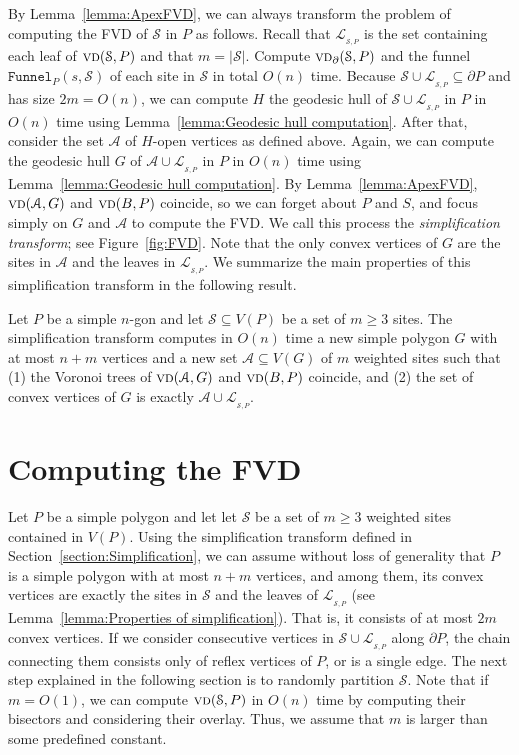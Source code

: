\documentclass[a4paper,UKenglish]{socg-lipics-v2018}
\newcommand{\s}{\mathcal S}
\newcommand{\funnel}[2][P]{\ensuremath{\mathtt{Funnel}_{\scriptscriptstyle #1}(#2)}}
\newcommand{\vd}[2][P]{\textsc{vd}(#2, #1)}
\newcommand{\bvd}[2][P]{\textsc{vd}_{\partial}(#2, #1)}
\newcommand{\LL}[1][\s, P]{\ensuremath{\mathcal L_{_{#1}}}}
\newcommand{\A}{\ensuremath{\mathcal A}}
\begin{document}
By Lemma~\ref{lemma:ApexFVD}, we can always transform the problem of computing the FVD of $\s$ in $P$ as follows. 
Recall that $\LL$ is the set containing each leaf of $\vd{\s}$ and that $m= |\s|$.
Compute $\bvd{\s}$ and the funnel $\funnel{s, \s}$ of each site in $\s$ in total $O(n)$ time. 
Because $\s\cup \LL\subseteq \partial P$ and has size $2 m = O(n)$, we can compute $H$ the geodesic hull of $\s\cup \LL$ in $P$ in $O(n)$ time using Lemma~\ref{lemma:Geodesic hull computation}. 
After that, consider the set $\A$ of $H$-open vertices as defined above.
Again, we can compute the geodesic hull $G$ of $\A\cup \LL$ in $P$ in $O(n)$ time using Lemma~\ref{lemma:Geodesic hull computation}. 
By Lemma~\ref{lemma:ApexFVD}, $\vd[G]{\A}$ and $\vd[P]{B}$ coincide, so we can forget about $P$ and $S$, and focus simply on $G$ and $\A$ to compute the FVD.
We call this process the \emph{simplification transform}; see Figure~\ref{fig:FVD}. 
Note that the only convex vertices of $G$ are the sites in $\A$ and the leaves in $\LL$. 
We summarize the main properties of this simplification transform in the following result.

\begin{lemma}\label{lemma:Properties of simplification}
Let  $P$ be a simple $n$-gon and let $\s\subseteq V(P)$ be a set of $m\geq 3$ sites.
The simplification transform computes in $O(n)$ time a new simple polygon $G$ with at most $n+m$ vertices and a new set $\A\subseteq V(G)$ of $m$ weighted sites such that (1) the Voronoi trees of $\vd[G]{\A}$ and $\vd[P]{B}$ coincide, and (2) the set of convex vertices of $G$ is exactly $\A\cup \LL$.
\end{lemma}



\section{Computing the FVD}
Let  $P$ be a simple polygon and let let $\s$ be a set of $m\geq 3$ weighted sites contained in $V(P)$.
Using the simplification transform defined in Section~\ref{section:Simplification}, we can assume without loss of generality that $P$ is a simple polygon with at most $n+m$ vertices, and among them, its convex vertices are exactly the sites in $\s$ and the leaves of $\LL$ (see Lemma~\ref{lemma:Properties of simplification}). 
That is, it consists of at most $2m$ convex vertices.
If we consider consecutive vertices in $\s\cup \LL$ along $\partial P$, the chain connecting them consists only of reflex vertices of $P$, or is a single edge. 
The next step explained in the following section is to randomly partition $\s$.
Note that if $m = O(1)$, we can compute $\vd{\s}$ in $O(n)$ time by computing their bisectors and considering their overlay. Thus, we assume that $m$ is larger than some predefined constant.
\end{document}
